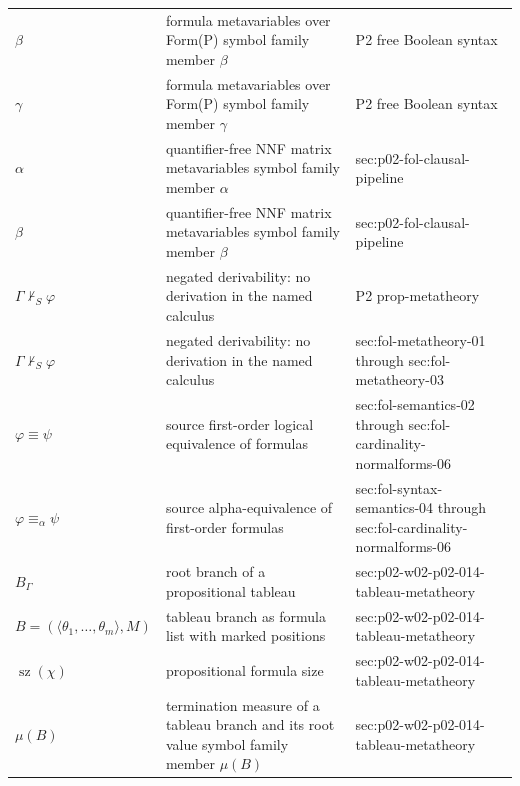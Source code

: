 \begin{longtable}{@{}p{}p{}p{}@{}}
\(\beta\) & formula metavariables over Form(P) symbol family member \(\beta\) & P2 free Boolean syntax \\
\(\gamma\) & formula metavariables over Form(P) symbol family member \(\gamma\) & P2 free Boolean syntax \\
\(\alpha\) & quantifier-free NNF matrix metavariables symbol family member \(\alpha\) & sec:\allowbreak{}p02-\allowbreak{}fol-\allowbreak{}clausal-\allowbreak{}pipeline \\
\(\beta\) & quantifier-free NNF matrix metavariables symbol family member \(\beta\) & sec:\allowbreak{}p02-\allowbreak{}fol-\allowbreak{}clausal-\allowbreak{}pipeline \\
\(\Gamma\nvdash_{S}\varphi\) & negated derivability: no derivation in the named calculus & P2 prop-\allowbreak{}metatheory \\
\(\Gamma\nvdash_{S}\varphi\) & negated derivability: no derivation in the named calculus & sec:\allowbreak{}fol-\allowbreak{}metatheory-\allowbreak{}01 through sec:\allowbreak{}fol-\allowbreak{}metatheory-\allowbreak{}03 \\
\(\varphi\equiv\psi\) & source first-order logical equivalence of formulas & sec:\allowbreak{}fol-\allowbreak{}semantics-\allowbreak{}02 through sec:\allowbreak{}fol-\allowbreak{}cardinality-\allowbreak{}normalforms-\allowbreak{}06 \\
\(\varphi\equiv_\alpha\psi\) & source alpha-equivalence of first-order formulas & sec:\allowbreak{}fol-\allowbreak{}syntax-\allowbreak{}semantics-\allowbreak{}04 through sec:\allowbreak{}fol-\allowbreak{}cardinality-\allowbreak{}normalforms-\allowbreak{}06 \\
\(B_\Gamma\) & root branch of a propositional tableau & sec:\allowbreak{}p02-\allowbreak{}w02-\allowbreak{}p02-\allowbreak{}014-\allowbreak{}tableau-\allowbreak{}metatheory \\
\(B=(\langle\theta_1,\allowbreak \ldots,\allowbreak \theta_m\rangle,\allowbreak M)\) & tableau branch as formula list with marked positions & sec:\allowbreak{}p02-\allowbreak{}w02-\allowbreak{}p02-\allowbreak{}014-\allowbreak{}tableau-\allowbreak{}metatheory \\
\(\operatorname{sz}(\chi)\) & propositional formula size & sec:\allowbreak{}p02-\allowbreak{}w02-\allowbreak{}p02-\allowbreak{}014-\allowbreak{}tableau-\allowbreak{}metatheory \\
\(\mu(B)\) & termination measure of a tableau branch and its root value symbol family member \(\mu(B)\) & sec:\allowbreak{}p02-\allowbreak{}w02-\allowbreak{}p02-\allowbreak{}014-\allowbreak{}tableau-\allowbreak{}metatheory \\

\end{longtable}
